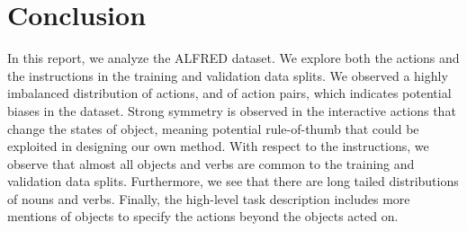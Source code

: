 \documentclass[11pt,a4paper]{article}
\begin{document}
\section{Conclusion}
In this report, we analyze the ALFRED \cite{ALFRED20} dataset. We explore both the actions and the instructions in the training and validation data splits.
We observed a highly imbalanced distribution of actions, and of action pairs, which indicates potential biases in the dataset. Strong symmetry is observed in the interactive actions that change the states of object, meaning potential rule-of-thumb that could be exploited in designing our own method.
With respect to the instructions, we observe that almost all objects and verbs are common to the training and validation data splits. Furthermore, we see that there are long tailed distributions of nouns and verbs. Finally, the high-level task description includes more mentions of objects to specify the actions beyond the objects acted on.


\clearpage



\end{document}
